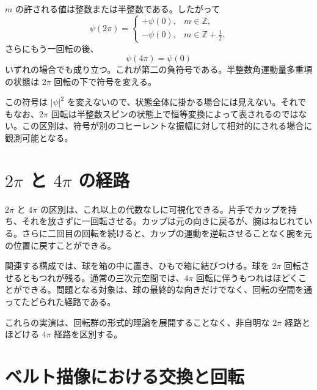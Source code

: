 \(m\) の許される値は整数または半整数である。したがって
\begin{equation}
\psi(2\pi)
=
\begin{cases}
+\psi(0), & m\in\mathbb Z,\\[4pt]
-\psi(0), & m\in\mathbb Z+\tfrac12.
\end{cases}
\end{equation}
さらにもう一回転の後、
\begin{equation}
\psi(4\pi)=\psi(0)
\end{equation}
いずれの場合でも成り立つ。これが第二の負符号である。半整数角運動量多重項の状態は \(2\pi\) 回転の下で符号を変える。

この符号は \(\lvert\psi\rvert^2\) を変えないので、状態全体に掛かる場合には見えない。それでもなお、\(2\pi\) 回転は半整数スピンの状態上で恒等変換によって表されるのではない。この区別は、符号が別のコヒーレントな振幅に対して相対的にされる場合に観測可能となる。

\section{\texorpdfstring{\(2\pi\) と \(4\pi\)}{2 パイおよび 4 パイ} の経路}

\(2\pi\) と \(4\pi\) の区別は、これ以上の代数なしに可視化できる。片手でカップを持ち、それを放さずに一回転させる。カップは元の向きに戻るが、腕はねじれている。さらに二回目の回転を続けると、カップの運動を逆転させることなく腕を元の位置に戻すことができる。

関連する構成では、球を箱の中に置き、ひもで箱に結びつける。球を \(2\pi\) 回転させるともつれが残る。通常の三次元空間では、\(4\pi\) 回転に伴うもつれはほどくことができる。問題となる対象は、球の最終的な向きだけでなく、回転の空間を通ってたどられた経路である。

\begin{classroomqa}
\end{classroomqa}

これらの実演は、回転群の形式的理論を展開することなく、非自明な \(2\pi\) 経路とほどける \(4\pi\) 経路を区別する。

\section{ベルト描像における交換と回転}

